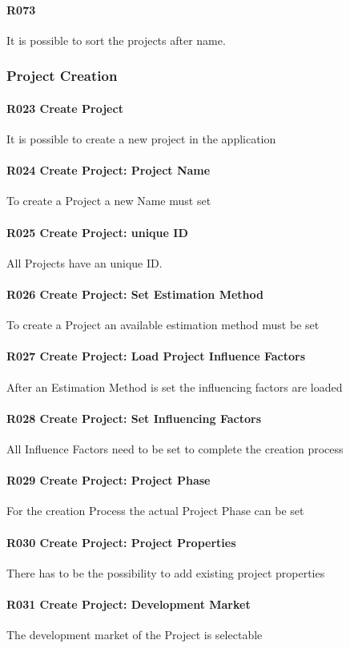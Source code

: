 \paragraph{R073}
It is possible to sort the projects after name.

\subsubsection{Project Creation}
\paragraph{R023 Create Project}
It is possible to create a new project in the application
\paragraph{R024 Create Project: Project Name}
To create a Project a new Name must set
\paragraph{R025 Create Project: unique ID}
All Projects have an unique ID.
\paragraph{R026 Create Project: Set Estimation Method}
To create a Project an available estimation method must be set
\paragraph{R027 Create Project: Load Project Influence Factors}
After an Estimation Method is set the influencing factors are loaded
\paragraph{R028 Create Project: Set Influencing Factors}
All Influence Factors need to be set to complete the creation process
\paragraph{R029 Create Project: Project Phase}
For the creation Process the actual Project Phase can be set
\paragraph{R030 Create Project: Project Properties}
There has to be the possibility to add existing project properties
\paragraph{R031 Create Project: Development Market}
The development market of the Project is selectable 

